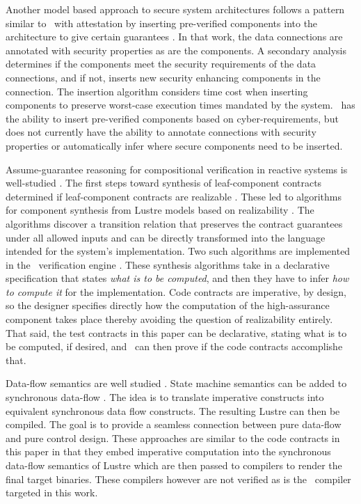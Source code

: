 
Another model based approach to secure system architectures follows a pattern similar to \brfcs\ with attestation by inserting pre-verified components into the architecture to give certain guarantees \cite{6209212}.
In that work, the data connections are annotated with security properties as are the components.
A secondary analysis determines if the components meet the security requirements of the data connections, and if not, inserts new security enhancing components in the connection.
The insertion algorithm considers time cost when inserting components to preserve worst-case execution times mandated by the system.
\brfcs\ has the ability to insert pre-verified components based on cyber-requirements, but does not currently have the ability to annotate connections with security properties or automatically infer where secure components need to be inserted.

Assume-guarantee reasoning for compositional verification in reactive systems is well-studied \cite{10.1007/978-3-642-28891-3_13, 10.1145/2658982.2527272, 10.1007/978-3-319-17524-9_7}.
The first steps toward synthesis of leaf-component contracts determined if leaf-component contracts are realizable \cite{10.1007/978-3-319-17524-9_13, 10.1007/978-3-319-29613-5_7}.
These led to algorithms for component synthesis from Lustre models based on realizability \cite{katis2017synthesis, 10.1007/978-3-319-89963-3_10}.
The algorithms discover a transition relation that preserves the contract guarantees under all allowed inputs and can be directly transformed into the language intended for the system's implementation.
Two such algorithms are implemented in the \agr\ verification engine \cite{jkind}.
These synthesis algorithms take in a declarative specification that states \emph{what is to be computed}, and then they have to infer \emph{how to compute it} for the implementation.
Code contracts are imperative, by design, so the designer specifies directly how the computation of the high-assurance component takes place thereby avoiding the question of realizability entirely.
That said, the test contracts in this paper can be declarative, stating what is to be computed, if desired, and \agr\ can then prove if the code contracts accomplishe that.

Data-flow semantics are well studied \cite{10.1145/41625.41641,97300,
10.1145/1379023.1375674,10.1145/2345141.2248426,10.1007/978-3-540-45212-6_10}.
State machine semantics can be added to synchronous
data-flow \cite{10.1145/1086228.1086261}. The idea is to translate
imperative constructs into equivalent synchronous data flow
constructs. The resulting Lustre can then be compiled. The goal is to
provide a seamless connection between pure data-flow and pure control
design.
These approaches are similar to the code contracts in this paper in that they embed imperative computation into the synchronous data-flow semantics of Lustre which are then passed to compilers to render the final target binaries.
These compilers however are not verified as is the \ckml\ compiler targeted in this work.

